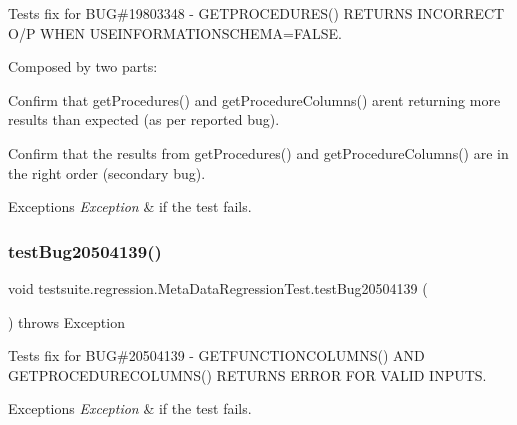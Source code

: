 Tests fix for B\+UG\#19803348 -\/ G\+E\+T\+P\+R\+O\+C\+E\+D\+U\+R\+E\+S() R\+E\+T\+U\+R\+NS I\+N\+C\+O\+R\+R\+E\+CT O/P W\+H\+EN U\+S\+E\+I\+N\+F\+O\+R\+M\+A\+T\+I\+O\+N\+S\+C\+H\+E\+MA=F\+A\+L\+SE.

Composed by two parts\+:
\begin{DoxyEnumerate}
\item Confirm that get\+Procedures() and get\+Procedure\+Columns() aren\textquotesingle{}t returning more results than expected (as per reported bug).
\item Confirm that the results from get\+Procedures() and get\+Procedure\+Columns() are in the right order (secondary bug).
\end{DoxyEnumerate}


\begin{DoxyExceptions}{Exceptions}
{\em Exception} & if the test fails. \\
\hline
\end{DoxyExceptions}
\mbox{\label{classtestsuite_1_1regression_1_1_meta_data_regression_test_ae79b95fa80f4d41af56448aa53d865bb}} 
\subsubsection{\texorpdfstring{test\+Bug20504139()}{testBug20504139()}}
{\footnotesize\ttfamily void testsuite.\+regression.\+Meta\+Data\+Regression\+Test.\+test\+Bug20504139 (\begin{DoxyParamCaption}{ }\end{DoxyParamCaption}) throws Exception}

Tests fix for B\+UG\#20504139 -\/ G\+E\+T\+F\+U\+N\+C\+T\+I\+O\+N\+C\+O\+L\+U\+M\+N\+S() A\+ND G\+E\+T\+P\+R\+O\+C\+E\+D\+U\+R\+E\+C\+O\+L\+U\+M\+N\+S() R\+E\+T\+U\+R\+NS E\+R\+R\+OR F\+OR V\+A\+L\+ID I\+N\+P\+U\+TS.


\begin{DoxyExceptions}{Exceptions}
{\em Exception} & if the test fails. \\
\hline
\end{DoxyExceptions}
\mbox{\label{classtestsuite_1_1regression_1_1_meta_data_regression_test_a4c0d9aaa7ffb0619d60cd9801b2afcba}} 
